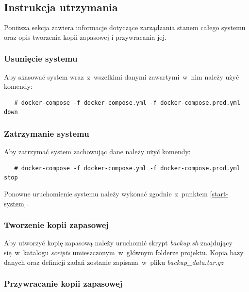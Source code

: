 \documentclass[a4paper,11pt,twoside]{report}
\theoremstyle{definition}
\begin{document}
    \subsection{Instrukcja utrzymania}

        Poniższa sekcja zawiera informacje dotyczące zarządzania stanem całego systemu oraz opis tworzenia kopii zapasowej i przywracania jej.

        \subsubsection{Usunięcie systemu}

            Aby skasować system wraz~z~wszelkimi danymi zawartymi~w~nim należy użyć komendy:

            \begin{verbatim}
   # docker-compose -f docker-compose.yml -f docker-compose.prod.yml down
            \end{verbatim}


        \subsubsection{Zatrzymanie systemu}

            Aby zatrzymać system zachowując dane należy użyć komendy:
            
            \begin{verbatim}
   # docker-compose -f docker-compose.yml -f docker-compose.prod.yml stop
            \end{verbatim}

            Ponowne uruchomienie systemu należy wykonać zgodnie~z~punktem \ref{start-system}.

        \subsubsection{Tworzenie kopii zapasowej}

            Aby utworzyć kopię zapasową należy uruchomić skrypt \textit{backup.sh} znajdujący się~w~katalogu \textit{scripts} umieszczonym~w~głównym folderze projektu. 
            Kopia bazy danych oraz definicji zadań zostanie zapisana~w~pliku \textit{backup\_data.tar.gz}
            
        \subsubsection{Przywracanie kopii zapasowej}
\end{document}
